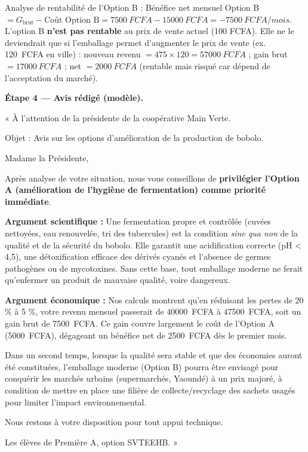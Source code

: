 \documentclass[11pt]{article}
\begin{document}
\begin{exoresolu}
Analyse de rentabilité de l'Option B :
Bénéfice net mensuel Option B $= G_{\text{brut}} - \text{Coût Option B} = \SI{7 500}{FCFA} - \SI{15 000}{FCFA} = -\SI{7 500}{FCFA/mois}$.
L'option B \textbf{n'est pas rentable} au prix de vente actuel (100 FCFA). Elle ne le deviendrait que si l'emballage permet d'augmenter le prix de vente (ex. \SI{120}{FCFA} en ville) : nouveau revenu $= 475 \times 120 = \SI{57 000}{FCFA}$ ; gain brut $= \SI{17 000}{FCFA}$ ; net $= \SI{2 000}{FCFA}$ (rentable mais risqué car dépend de l'acceptation du marché).

\textbf{Étape 4 — Avis rédigé (modèle).}

« À l'attention de la présidente de la coopérative Main Verte.

Objet : Avis sur les options d'amélioration de la production de bobolo.

Madame la Présidente,

Après analyse de votre situation, nous vous conseillons de \textbf{privilégier l'Option A (amélioration de l'hygiène de fermentation) comme priorité immédiate}.

\textbf{Argument scientifique :} Une fermentation propre et contrôlée (cuvées nettoyées, eau renouvelée, tri des tubercules) est la condition \textit{sine qua non} de la qualité et de la sécurité du bobolo. Elle garantit une acidification correcte (pH < 4,5), une détoxification efficace des dérivés cyanés et l'absence de germes pathogènes ou de mycotoxines. Sans cette base, tout emballage moderne ne ferait qu'enfermer un produit de mauvaise qualité, voire dangereux.

\textbf{Argument économique :} Nos calculs montrent qu'en réduisant les pertes de 20 \% à 5 \%, votre revenu mensuel passerait de \SI{40 000}{FCFA} à \SI{47 500}{FCFA}, soit un gain brut de \SI{7 500}{FCFA}. Ce gain couvre largement le coût de l'Option A (\SI{5 000}{FCFA}), dégageant un bénéfice net de \SI{2 500}{FCFA} dès le premier mois.

Dans un second temps, lorsque la qualité sera stable et que des économies auront été constituées, l'emballage moderne (Option B) pourra être envisagé pour conquérir les marchés urbains (supermarchés, Yaoundé) à un prix majoré, à condition de mettre en place une filière de collecte/recyclage des sachets usagés pour limiter l'impact environnemental.

Nous restons à votre disposition pour tout appui technique.

Les élèves de Première A, option SVTEEHB. »
\end{exoresolu}
\end{document}
